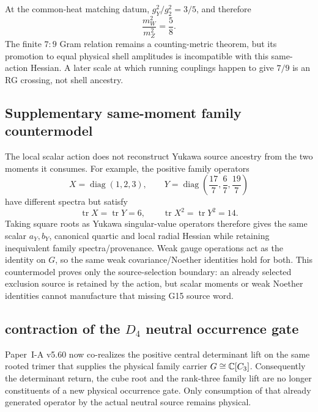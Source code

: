 \documentclass[11pt,a4paper]{article}
\begin{document}
\begin{corollary}
\label{p5:cor:v164-source-native-ew-ratio}
At the common-heat matching datum,
\(g_Y^2/g_2^2=3/5\), and therefore
\[
 \boxed{\frac{m_W^2}{m_Z^2}=\frac58.}
\]
The finite \(7:9\) Gram relation remains a counting-metric theorem, but its
promotion to equal physical shell amplitudes is incompatible with this
same-action Hessian.  A later scale at which running couplings happen to give
\(7/9\) is an RG crossing, not shell ancestry.
\end{corollary}

\subsection{Supplementary same-moment family countermodel}
\label{p5:app:v181-same-moment-family-countermodel}
The local scalar action does not reconstruct Yukawa source ancestry from the
two moments it consumes.  For example, the positive family operators
\[
 X=\operatorname{diag}(1,2,3),\qquad
 Y=\operatorname{diag}\!\left(\frac{17}{7},\frac67,\frac{19}{7}\right)
\]
have different spectra but satisfy
\[
 \operatorname{tr}X=\operatorname{tr}Y=6,\qquad
 \operatorname{tr}X^2=\operatorname{tr}Y^2=14.
\]
Taking square roots as Yukawa singular-value operators therefore gives the
same scalar $a_Y,b_Y$, canonical quartic and local radial Hessian while
retaining inequivalent family spectra/provenance.  Weak gauge operations act
as the identity on $G$, so the same weak covariance/Noether identities hold
for both.  This countermodel proves only the source-selection boundary: an
already selected exclusion source is retained by the action, but scalar
moments or weak Noether identities cannot manufacture that missing G15
source word.


\subsection{contraction of the \texorpdfstring{\(D_4\)}{D4} neutral occurrence gate}
\label{p5:sec:v374-d4-neutral-source-contraction}

Paper~I-A v5.60 now co-realizes the positive central determinant lift on the
same rooted trimer that supplies the physical family carrier
\(G\cong\mathbb{C}[C_3]\).  Consequently the determinant return, the cube root and
the rank-three family lift are no longer constituents of a new physical
occurrence gate.  Only consumption of that already generated operator by the
actual neutral source remains physical.
\end{document}
